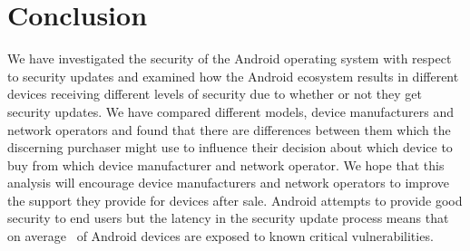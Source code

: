 \documentclass[conference,a4paper,twoside]{IEEEtran}
\newcommand{\identifying}[1]{}%
\begin{document}
\section{Conclusion}
\label{sec:conclusion}
We have investigated the security of the Android operating system with respect to security updates and examined how the Android ecosystem results in different devices receiving different levels of security due to whether or not they get security updates.
We have compared different models, device manufacturers and network operators and found that there are differences between them which the discerning purchaser might use to influence their decision about which device to buy from which device manufacturer and network operator.
We hope that this analysis will encourage device manufacturers and network operators to improve the support they provide for devices after sale.
Android attempts to provide good security to end users but the latency in the security update process means that on average \daMeanInsecurityPerc\ of Android devices are exposed to known critical vulnerabilities.

\identifying{
\section*{Acknowledgements}
Thanks to David Robertson for helpful advice on statistical analysis.
Thanks to Laurent Simon, Thomas Coudray, Adrian Taylor, Justin Case, Giant Pune and Khilan Gudka for reporting vulnerabilities in Android.
}

\printbibliography


\listoftodos
\end{document}
